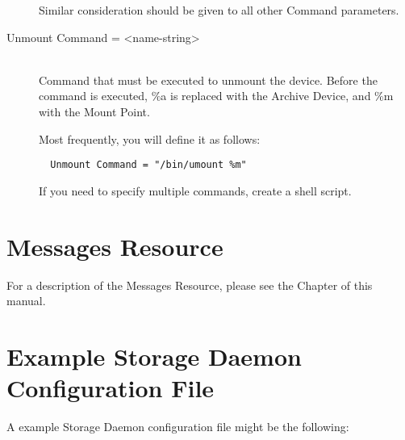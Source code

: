 \begin{description}
Similar consideration should be given to all other Command parameters.

\item [Unmount Command = {\textless}name-string{\textgreater}] \hfill \\
Command that must be executed to unmount the device. Before the command  is
executed, \%a is replaced with the Archive Device, and \%m with the  Mount
Point.

Most frequently, you will define it as follows:

\footnotesize
\begin{verbatim}
  Unmount Command = "/bin/umount %m"
\end{verbatim}
\normalsize

  If you need to specify multiple commands, create a shell script.

\end{description}





\section{Messages Resource}
\label{MessagesResource1}

For a description of the Messages Resource, please see the
 Chapter of this
manual.

\section{Example Storage Daemon Configuration File}
\label{ExampleStorageConfiguration}


A example Storage Daemon configuration file might be the following:

\footnotesize
{}
\normalsize
